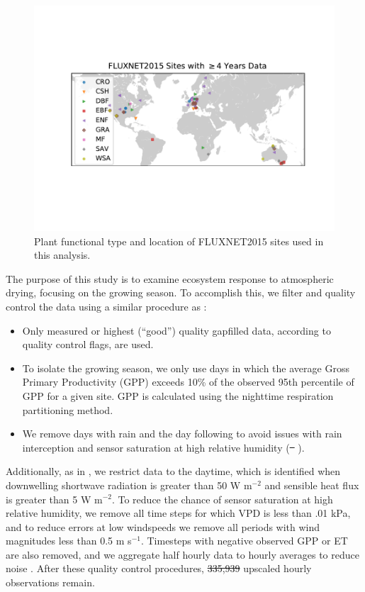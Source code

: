 \documentclass[draft,linenumbers]{agujournal}
\providecommand{\DIFadd}[1]{{\protect\color{blue}\uwave{#1}}} %
\providecommand{\DIFdel}[1]{{\protect\color{red}\sout{#1}}}                      %
\providecommand{\DIFaddbegin}{} %
\providecommand{\DIFaddend}{} %
\providecommand{\DIFdelbegin}{} %
\providecommand{\DIFdelend}{} %
\begin{document}
\DIFdelend \begin{figure}
  \centering \includegraphics[width=\textwidth]{./map.pdf}
  \caption{Plant functional type and location of FLUXNET2015 sites
    used in this analysis.}
  \label{map_fig}
\end{figure}

The purpose of this study is to examine ecosystem response to
atmospheric drying, focusing on the growing season. To accomplish
this, we filter and quality control the data using a similar procedure
as \cite{Zhou_2015}:
 \begin{itemize} 
\item Only measured or highest (``good'') quality gapfilled data,
  according to quality control flags, are used.
\item To isolate the growing season, we only use days in which the
  average Gross Primary Productivity (GPP) exceeds 10\% of the
  observed 95th percentile of GPP for a given site. GPP is calculated
  using the nighttime respiration partitioning method.
\item We remove days with rain and the day following to avoid issues
  with rain interception and sensor saturation at high relative
  humidity (\DIFdelbegin \DIFdel{\mbox{%
\cite{MEDLYN_2011}}%
}\DIFdelend \DIFaddbegin \DIFadd{\mbox{%
\cite{Medlyn_2017}}%
}\DIFaddend ).
 \end{itemize} 
Additionally, as in \citet{Lin_2018}, we restrict data to the daytime,
which is identified when downwelling shortwave radiation is greater
than 50 W m$^{-2}$ and sensible heat flux is greater than 5 W
m$^{-2}$. To reduce the chance of sensor saturation at high relative
humidity, we remove all time steps for which VPD is less than .01 kPa,
and to reduce errors at low windspeeds we remove all periods with wind
magnitudes less than 0.5 m s$^{-1}$. Timesteps with negative observed
GPP or ET are also removed, and we aggregate half hourly data to
hourly averages to reduce noise \citep{Lin_2018}. After these quality
control procedures, \DIFdelbegin \DIFdel{335,939
}\DIFdelend \DIFaddbegin \DIFadd{434,765 }\DIFaddend upscaled hourly observations remain.
\end{document}
